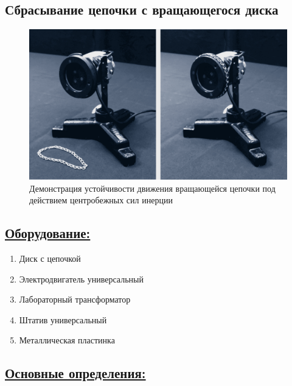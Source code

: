 \documentclass[14pt,a4paper,twoside]{extarticle}	%
\begin{document}
	
\newpage
\begin{center}
	\subsection*{Сбрасывание цепочки с вращающегося диска}
\end{center}
		
\begin{figure}[H] 	
	\centering 	
		\includegraphics[width=0.9\linewidth]{chain-1.png}
		\caption{Демонстрация устойчивости движения вращающейся цепочки под действием центробежных сил инерции}
		\label{chain-1}
	\end{figure}
		
		\subsection*{\underline{Оборудование:}}
		
		\begin{enumerate}
			\item Диск с цепочкой
			\item Электродвигатель универсальный
			\item Лабораторный трансформатор
			\item Штатив универсальный
			\item Металлическая пластинка
		\end{enumerate}
		
		\subsection*{\underline{Основные определения:}}
		
\end{document}

